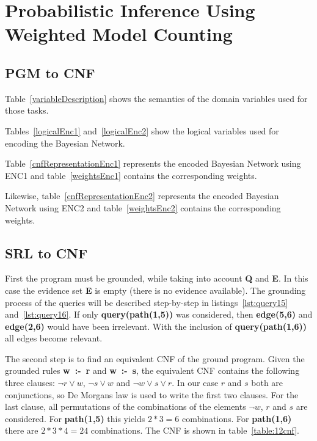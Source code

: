 \section{Probabilistic Inference Using Weighted Model Counting}
\subsection{PGM to CNF}

Table~\ref{variableDescription} shows the semantics of the domain variables used for those tasks.

Tables~\ref{logicalEnc1} and~\ref{logicalEnc2} show the logical variables used for encoding the Bayesian Network.

Table~\ref{cnfRepresentationEnc1} represents the encoded Bayesian Network using ENC1 and table~\ref{weightsEnc1} contains the corresponding weights.

Likewise, table~\ref{cnfRepresentationEnc2} represents the encoded Bayesian Network using ENC2 and table~\ref{weightsEnc2} contains the corresponding weights.





%



%





\subsection{SRL to CNF}

First the program must be grounded, while taking into account \textbf{Q} and \textbf{E}. In this case the evidence set \textbf{E} is empty (there is no evidence available). The grounding process of the queries will be described step-by-step in listings~\ref{lst:query15} and~\ref{lst:query16}.  If only \textbf{query(path(1,5))} was considered, then \textbf{edge(5,6)} and \textbf{edge(2,6)} would have been irrelevant. With the inclusion of \textbf{query(path(1,6))} all edges become relevant.



The second step is to find an equivalent CNF of the ground program. Given the grounded rules \mbox{\textbf{w :- r}} and \mbox{\textbf{w :- s}}, the equivalent CNF contains the following three clauses: $\neg r \lor w$, $\neg s \lor w$ and $\neg w \lor s \lor r$. In our case $r$ and $s$ both are conjunctions, so De Morgans law is used to write the first two clauses. For the last clause, all permutations of the combinations of the elements $\neg w$, $r$ and $s$ are considered. For \textbf{path(1,5)} this yields $2*3 = 6$ combinations. For \textbf{path(1,6)} there are $2*3*4 = 24$ combinations. The CNF is shown in table~\ref{table:12cnf}.

